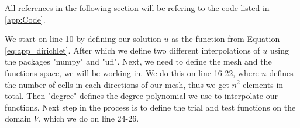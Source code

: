 
All references in the following section will be refering to the code listed in \ref{app:Code}.

We start on line 10 by defining our solution $u$ as the function from Equation \eqref{eq:app_dirichlet}.
After which we define two different interpolations of $u$ using the packages "numpy" and "ufl". 
Next, we need to define the mesh and the functions space, we will be working in. 
We do this on line 16-22, where $n$ defines the number of cells in each directions of our mesh, thus we get $n^2$ elements in total.
Then "degree" defines the degree polynomial we use to interpolate our functions.
Next step in the process is to define the trial and test functions on the domain $V$, which we do on line 24-26.
